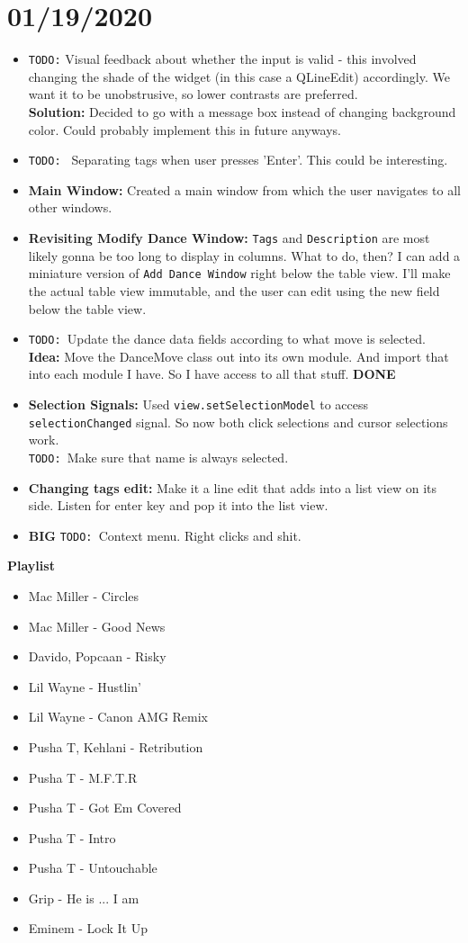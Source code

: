 \documentclass{article}
\begin{document}
\section{01/19/2020}
\begin{itemize}
	\item \texttt{TODO:} Visual feedback about whether the input is valid - this involved changing the shade of the widget (in this case a QLineEdit) accordingly. We want it to be unobstrusive, so lower contrasts are preferred.\\
	\textbf{Solution: }Decided to go with a message box instead of changing background color. Could probably implement this in future anyways.
	\item \texttt{TODO: } Separating tags when user presses 'Enter'. This could be interesting. 
	\item \textbf{Main Window: }Created a main window from which the user navigates to all other windows.  
	\item \textbf{Revisiting Modify Dance Window: }\texttt{Tags} and \texttt{Description} are most likely gonna be too long to display in columns. What to do, then? I can add a miniature version of \texttt{Add Dance Window} right below the table view. I'll make the actual table view immutable, and the user can edit using the new field below the table view.
	\item \texttt{TODO: }Update the dance data fields according to what move is selected. \textbf{Idea: }Move the DanceMove class out into its own module. And import that into each module I have. So I have access to all that stuff. \textbf{DONE}
	\item \textbf{Selection Signals: }Used \texttt{view.setSelectionModel} to access \texttt{selectionChanged} signal. So now both click selections and cursor selections work. \\
	\texttt{TODO: }Make sure that name is always selected.
	\item \textbf{Changing tags edit: }Make it a line edit that adds into a list view on its side. Listen for enter key and pop it into the list view. 
	\item \textbf{BIG }\texttt{TODO: }Context menu. Right clicks and shit.
\end{itemize}
\textbf{Playlist}
\begin{itemize}
	\item Mac Miller - Circles
	\item Mac Miller - Good News
	\item Davido, Popcaan - Risky
	\item Lil Wayne - Hustlin'
	\item Lil Wayne - Canon AMG Remix
	\item Pusha T, Kehlani - Retribution
	\item Pusha T - M.F.T.R
	\item Pusha T - Got Em Covered
	\item Pusha T - Intro
	\item Pusha T - Untouchable
	\item Grip - He is ... I am
	\item Eminem - Lock It Up
\end{itemize}
\end{document}
